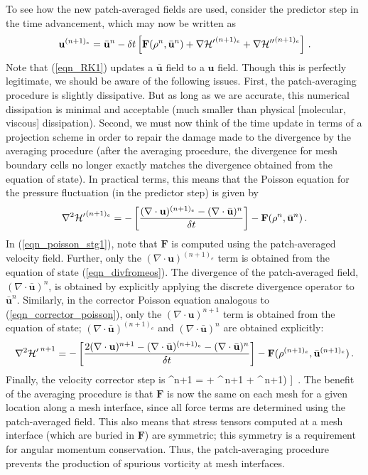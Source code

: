 \documentclass[11pt]{book}
\begin{document}
To see how the new patch-averaged fields are used, consider the predictor step in the time advancement, which may now be written as
\begin{equation}
\label{eqn_RK1}
\mathbf{u}^{(n+1)_e} = \bar{\mathbf{u}}^n - \delta t \left[ \mathbf{F}(\rho^n,\bar{\mathbf{u}}^n) + {\nabla{\cal H}'}^{(n+1)_e} + {\nabla{\cal H}''}^{(n+1)_e} \right] \,\mbox{.}
\end{equation}
Note that (\ref{eqn_RK1}) updates a $\bar{\mathbf{u}}$ field to a $\mathbf{u}$ field.  Though this is perfectly legitimate, we should be aware of the following issues.
First, the patch-averaging procedure is slightly dissipative.  But as long as we are accurate, this numerical dissipation is minimal and acceptable (much smaller than
physical [molecular, viscous] dissipation).  Second, we must now think of the time update in terms of a projection scheme in order to repair the damage made to the
divergence by the averaging procedure (after the averaging procedure, the divergence for mesh boundary cells no longer exactly matches the divergence obtained from the equation of state).
In practical terms, this means that the Poisson equation for the pressure fluctuation (in the predictor step) is given by
\begin{equation}
\label{eqn_poisson_stg1}
\nabla^2 {{\cal H}'}^{(n+1)_e} = -\left[\frac{ (\nabla\cdot\mathbf{u})^{(n+1)_e} - (\nabla\cdot\bar{\mathbf{u}})^n}{\delta t}\right] -  \mathbf{F}(\rho^n,\bar{\mathbf{u}}^n) \,\mbox{.}
\end{equation}
In (\ref{eqn_poisson_stg1}), note that $\mathbf{F}$ is computed using the patch-averaged velocity field. Further, only the $(\nabla\cdot\mathbf{u})^{(n+1)_e}$ term is obtained from the equation of state (\ref{eqn_divfromeos}).  The divergence of the patch-averaged field, $(\nabla\cdot\bar{\mathbf{u}})^n$, is obtained by explicitly applying the discrete divergence operator to $\bar{\mathbf{u}}^n$.
Similarly, in the corrector Poisson equation analogous to (\ref{eqn_corrector_poisson}), only the $(\nabla\cdot\mathbf{u})^{n+1}$ term is obtained from the equation of state;
$(\nabla\cdot\bar{\mathbf{u}})^{(n+1)_e}$ and $(\nabla\cdot\bar{\mathbf{u}})^n$ are obtained explicitly:
\begin{equation}
\label{eqn_poisson_stg2}
\nabla^2 {{\cal H}'}^{\,n+1} = -\left[\frac{ 2(\nabla\cdot\mathbf{u})^{n+1} - (\nabla\cdot\bar{\mathbf{u}})^{(n+1)_e} - (\nabla\cdot\bar{\mathbf{u}})^n}{\delta t}\right] -  \mathbf{F}(\rho^{(n+1)_e},\bar{\mathbf{u}}^{(n+1)_e}) \,\mbox{.}
\end{equation}
Finally, the velocity corrector step is
\be
\label{eqn_RK2}
\bu^{n+1} = \ha \left[ \bar{\bu}^n + \bar{\bu}^{(n+1)_e} - \dt \left( \mathbf{F}[\rho^{(n+1)_e},\bar{\mathbf{u}}^{(n+1)_e}] + ^{\,n+1} + ^{\,n+1}\right) \right] \,\mbox{.}
\ee
The benefit of the averaging procedure is that $\mathbf{F}$ is now the same on each mesh for a given location along a mesh interface, since all force terms are determined using the patch-averaged field.  This also means that stress tensors computed at a mesh interface (which are buried in $\mathbf{F}$) are symmetric; this symmetry is a requirement for angular momentum conservation.  Thus, the patch-averaging procedure prevents the production of spurious vorticity at mesh interfaces.
\end{document}
